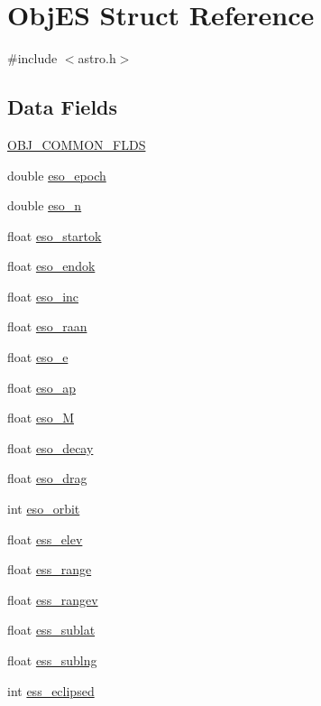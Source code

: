 \hypertarget{struct_obj_e_s}{\section{Obj\-E\-S Struct Reference}
\label{struct_obj_e_s}
}


{\ttfamily \#include $<$astro.\-h$>$}

\subsection*{Data Fields}
\begin{DoxyCompactItemize}
\item 
\hyperlink{struct_obj_e_s_aa17c09f5e88fab7e6a51c49354bb02ee}{O\-B\-J\-\_\-\-C\-O\-M\-M\-O\-N\-\_\-\-F\-L\-D\-S}
\item 
double \hyperlink{struct_obj_e_s_a802b004e0f70e92b5f802e2180f8e148}{eso\-\_\-epoch}
\item 
double \hyperlink{struct_obj_e_s_a0b9468f1fb373568988b87602681a7a1}{eso\-\_\-n}
\item 
float \hyperlink{struct_obj_e_s_ac838c1e7532b7f21df767d8592dcfc08}{eso\-\_\-startok}
\item 
float \hyperlink{struct_obj_e_s_acdad5e0584580a009d4df491f5ddcaa3}{eso\-\_\-endok}
\item 
float \hyperlink{struct_obj_e_s_ae8b1d0cd54db2151a4f3abce93867e34}{eso\-\_\-inc}
\item 
float \hyperlink{struct_obj_e_s_a2706cc4697ba62259e2c8d0a5355d983}{eso\-\_\-raan}
\item 
float \hyperlink{struct_obj_e_s_a4d259cf59761ca0815135a61a8c27fa7}{eso\-\_\-e}
\item 
float \hyperlink{struct_obj_e_s_ac284ba51510c470c5672dc49f72777d6}{eso\-\_\-ap}
\item 
float \hyperlink{struct_obj_e_s_ab1e0b35f063c6e34fa2a8e9bd917eecd}{eso\-\_\-\-M}
\item 
float \hyperlink{struct_obj_e_s_ad784c67228eff476b3ba6f807534889a}{eso\-\_\-decay}
\item 
float \hyperlink{struct_obj_e_s_a52ee31a4760f42b6cd3d3a135b432ddd}{eso\-\_\-drag}
\item 
int \hyperlink{struct_obj_e_s_a5447658f274c3195b450ee8ba9249590}{eso\-\_\-orbit}
\item 
float \hyperlink{struct_obj_e_s_a754520e026b1784fa73a11798ca0682f}{ess\-\_\-elev}
\item 
float \hyperlink{struct_obj_e_s_aa99b244fa218d755675be8a6bd4d50fb}{ess\-\_\-range}
\item 
float \hyperlink{struct_obj_e_s_a5fc85c3154a0491477936c63f7399664}{ess\-\_\-rangev}
\item 
float \hyperlink{struct_obj_e_s_a21073da516913e1888857e168ec25bf3}{ess\-\_\-sublat}
\item 
float \hyperlink{struct_obj_e_s_aea3fddbd7be1bbcbb13c6f8f1e468a6f}{ess\-\_\-sublng}
\item 
int \hyperlink{struct_obj_e_s_ac6d7c45b158ba372b583c2fe679f87f9}{ess\-\_\-eclipsed}
\end{DoxyCompactItemize}


